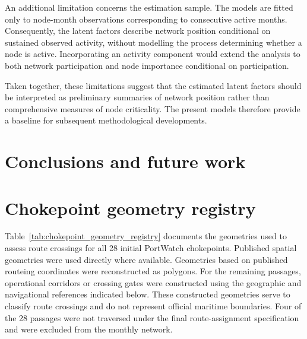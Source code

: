 \documentclass[pdftex,12pt,openright,a4paper,oneside]{book}
\begin{document}
An additional limitation concerns the estimation
sample. The models are fitted only to node-month
observations corresponding to consecutive active
months. Consequently, the latent factors describe
network position conditional on sustained observed
activity, without modelling the process determining
whether a node is active. Incorporating an activity
component would extend the analysis to both network
participation and node importance conditional on
participation.

Taken together, these limitations suggest that the
estimated latent factors should be interpreted as
preliminary summaries of network position rather
than comprehensive measures of node criticality.
The present models therefore provide a baseline
for subsequent methodological developments.
%
%
\chapter{Conclusions and future work}
\label{chap:conclusions}
% 
% 
\appendix
{}

\chapter{Chokepoint geometry registry}
\label{app:chokepoint_geometries}

Table~\ref{tab:chokepoint_geometry_registry} documents the geometries
used to assess route crossings for all 28 initial PortWatch
chokepoints. Published spatial geometries were used directly where
available. Geometries based on published routeing coordinates were
reconstructed as polygons. For the remaining passages, operational
corridors or crossing gates were constructed using the geographic
and navigational references indicated below. These constructed
geometries serve to classify route crossings and do not represent
official maritime boundaries. Four of the 28 passages were not
traversed under the final route-assignment specification and were
excluded from the monthly network.
\end{document}
